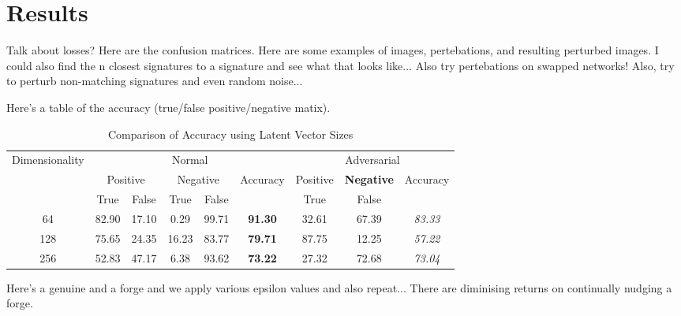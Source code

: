 \section{Results}\label{sec:results}

Talk about losses?
Here are the confusion matrices.
Here are some examples of images, pertebations, and resulting perturbed images.
I could also find the n closest signatures to a signature and see what that looks like...
Also try pertebations on swapped networks!
Also, try to perturb non-matching signatures and even random noise...

Here's a table of the accuracy (true/false positive/negative matix).

\begin{table*}[t]
    \centering
    \begin{tabular}{|c | c c | c c | >{\bfseries}c | c c >{\em}c|}
        \hline
        \multirow{3}{*}{Dimensionality} & \multicolumn{5}{c|}{Normal} & \multicolumn{3}{c|}{Adversarial}\\
        & \multicolumn{2}{c|}{Positive} & \multicolumn{2}{c|}{Negative} & \multirow{2}{*}{Accuracy} & Positive & Negative & \multirow{2}{*}{Accuracy}\\
        & True & False & True & False & & True & False & \\
        \hline
        64  & 82.90 & 17.10 & 0.29 & 99.71 & 91.30 & 32.61 & 67.39 & 83.33\\
        128 & 75.65 & 24.35 & 16.23 & 83.77 & 79.71 & 87.75 & 12.25 & 57.22\\
        256 & 52.83 & 47.17 & 6.38 & 93.62 & 73.22 & 27.32 & 72.68 & 73.04\\ [0.1ex]
        \hline
    \end{tabular}
    \caption{Comparison of Accuracy using Latent Vector Sizes}
    \label{table:1}
\end{table*}

Here's a genuine and a forge and we apply various epsilon values and also repeat...
    There are diminising returns on continually nudging a forge.

